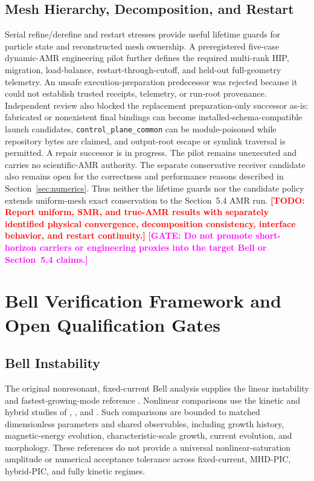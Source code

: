 \documentclass[twocolumn]{aastex701}
\newcommand{\TODO}[1]{\textcolor{red}{\textbf{[TODO: #1]}}}
\newcommand{\GATE}[1]{\textcolor{magenta}{\textbf{[GATE: #1]}}}
\begin{document}
\subsection{Mesh Hierarchy, Decomposition, and Restart}

Serial refine/derefine and restart stresses provide useful lifetime guards for
particle state and reconstructed mesh ownership. A preregistered five-case
dynamic-AMR engineering pilot further defines the required multi-rank HIP,
migration, load-balance, restart-through-cutoff, and held-out full-geometry
telemetry. An unsafe execution-preparation predecessor was rejected because it
could not establish trusted receipts, telemetry, or run-root provenance.
Independent review also blocked the replacement preparation-only successor
as-is: fabricated or nonexistent final bindings can become
installed-schema-compatible launch candidates, \texttt{control\_plane\_common}
can be module-poisoned while repository bytes are claimed, and output-root
escape or symlink traversal is permitted. A repair successor is in progress.
The pilot remains unexecuted and carries no scientific-AMR authority. The
separate conservative receiver candidate also remains open for the correctness
and performance reasons described in
Section~\ref{sec:numerics}. Thus neither the lifetime guards nor the candidate
policy extends uniform-mesh exact conservation to the Section~5.4 AMR run.
\TODO{Report uniform, SMR, and true-AMR results with separately identified
physical convergence, decomposition consistency, interface behavior, and
restart continuity.}
\GATE{Do not promote short-horizon carriers or engineering proxies into the
target Bell or Section~5.4 claims.}

\section{Bell Verification Framework and Open Qualification Gates}
\label{sec:physical-benchmarks}

\subsection{Bell Instability}
\label{sec:bell}

The original nonresonant, fixed-current Bell analysis supplies the linear
instability and fastest-growing-mode reference \citep{Bell2004}. Nonlinear
comparisons use the kinetic and hybrid studies of
\citet{RiquelmeSpitkovsky2009}, \citet{GargateEtAl2010}, and
\citet{ZacharegkasEtAl2024}. Such comparisons are bounded to matched
dimensionless parameters and shared observables, including growth history,
magnetic-energy evolution, characteristic-scale growth, current evolution, and
morphology. These references do not provide a universal nonlinear-saturation
amplitude or numerical acceptance tolerance across fixed-current, MHD-PIC,
hybrid-PIC, and fully kinetic regimes.
\end{document}
